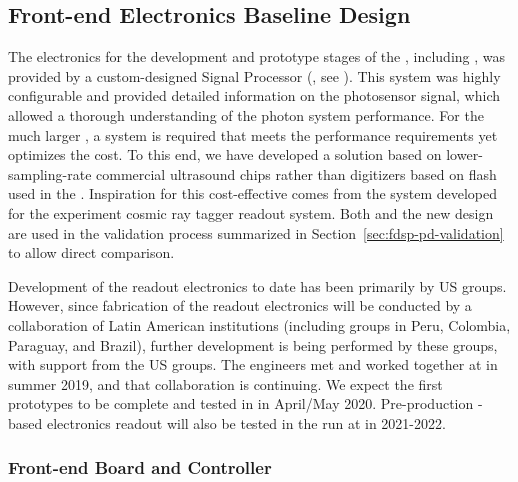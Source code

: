 
\subsection{Front-end Electronics Baseline Design}
\label{sec:electronics}

The  electronics for the development and prototype stages of the  , including , was provided by a custom-designed  Signal Processor (, see ). This system was highly configurable and provided detailed information on the photosensor signal, which allowed a thorough understanding of the photon system performance.
For the much larger , a system is required that meets the performance requirements yet optimizes the cost.
To this end, we have developed a solution based on lower-sampling-rate commercial ultrasound  chips rather than digitizers based on flash  used in the . Inspiration for this cost-effective  comes from the system developed for the  experiment cosmic ray tagger readout system.
Both  and the new design are used in the  validation process summarized in Section~\ref{sec:fdsp-pd-validation} to allow direct comparison.

Development of the readout electronics to date has been primarily by US groups. 
However, since fabrication of the  readout electronics will be conducted by a collaboration of Latin American institutions (including groups in Peru, Colombia, Paraguay, and Brazil), further development is being performed by these groups, with support from the US groups.  
The engineers met and worked together at  in summer 2019, and that collaboration is continuing.  We expect the first  prototypes to be complete and tested in  in April/May 2020.  
Pre-production -based electronics readout will also be tested in the  run at  in 2021-2022.


\subsubsection{Front-end Board and Controller}

